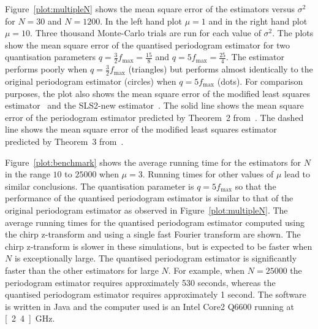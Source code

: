 \documentclass[10pt,twocolumn,twoside]{IEEEtran}
\begin{document}
Figure~\ref{plot:multipleN} shows the mean square error of the estimators versus $\sigma^2$ for $N = 30$ and $N = 1200$.  In the left hand  plot $\mu=1$ and in the right hand plot $\mu=10$.  %
Three thousand Monte-Carlo trials are run for each value of $\sigma^2$.  The plots show the mean square error of the quantised periodogram estimator for two quantisation parameters $q = \tfrac{3}{2}f_{\text{max}} = \tfrac{15}{8}$ and $q = 5 f_{\text{max}} = \tfrac{25}{4}$.  The estimator performs poorly when $q = \tfrac{3}{2}f_{\text{max}}$ (triangles) but performs almost identically to the original periodogram estimator (circles) when $q = 5 f_{\text{max}}$ (dots).  For comparison purposes, the plot also shows the mean square error of the modified least squares estimator~\cite{Clarkson2007,McKilliam2007} and the SLS2-new estimator~\cite{Clarkson2007,Sidiropoulos2005}.  %
The solid line shows the mean square error of the periodogram estimator predicted by Theorem~2 from~\cite{Quinn20013asilomar_period_est}.  The dashed line shows the mean square error of the modified least squares estimator predicted by Theorem~3 from~\cite{Quinn_sparse_noisy_SSP_2012}.

Figure~\ref{plot:benchmark} shows the average running time for the estimators for $N$ in the range $10$ to $25000$ when $\mu=3$.  Running times for other values of $\mu$ lead to similar conclusions.  The quantisation parameter is $q = 5 f_{\text{max}}$ so that the performance of the quantised periodogram estimator is similar to that of the original periodogram estimator as observed in Figure~\ref{plot:multipleN}.  The average running times for the quantised periodogram estimator computed using the chirp z-transform and using a single fast Fourier transform are shown.  The chirp z-transform is slower in these simulations, but is expected to be faster when $N$ is exceptionally large.  %
The quantised periodogram estimator is significantly faster than the other estimators for large $N$.  For example, when $N = 25000$ the periodogram estimator requires approximately 530 seconds, whereas the quantised periodogram estimator requires approximately 1 second.  The software is written in Java and the computer used is an Intel Core2 Q6600 running at \unit[2.4]{GHz}. 
\end{document}
